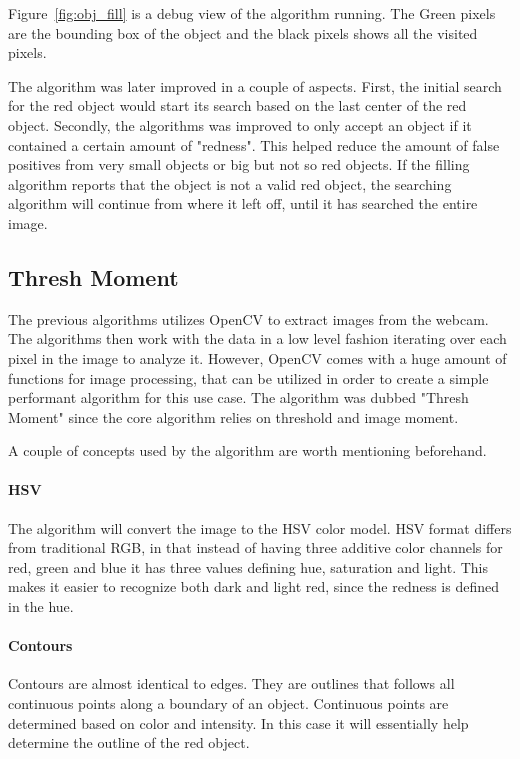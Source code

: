 Figure~\ref{fig:obj_fill} is a debug view of the algorithm running.
The Green pixels are the bounding box of the object and the black pixels shows all the visited pixels.


The algorithm was later improved in a couple of aspects.
First, the initial search for the red object would start its search based on the last center of the red object.
Secondly, the algorithms was improved to only accept an object if it contained a certain amount of "redness".
This helped reduce the amount of false positives from very small objects or big but not so red objects.
If the filling algorithm reports that the object is not a valid red object, the searching algorithm will continue from where it left off, until it has searched the entire image.

\subsection{Thresh Moment}

The previous algorithms utilizes OpenCV to extract images from the webcam. 
The algorithms then work with the data in a low level fashion iterating over each pixel in the image to analyze it.
However, OpenCV comes with a huge amount of functions for image processing, that can be utilized in order to create a simple performant algorithm for this use case. 
The algorithm was dubbed "Thresh Moment" since the core algorithm relies on threshold and image moment.

A couple of concepts used by the algorithm are worth mentioning beforehand.

\paragraph{HSV}
The algorithm will convert the image to the HSV color model.
HSV format differs from traditional RGB, in that instead of having three additive color channels for red, green and blue it has three values defining hue, saturation and light.
This makes it easier to recognize both dark and light red, since the redness is defined in the hue.

\paragraph{Contours}
Contours are almost identical to edges.
They are outlines that follows all continuous points along a boundary of an object.
Continuous points are determined based on color and intensity.
In this case it will essentially help determine the outline of the red object.\cite{contours}

